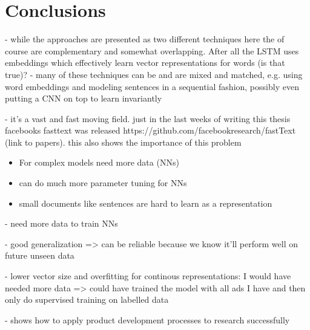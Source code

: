 
\clearpage

\section{Conclusions}
\label{sec:Conclusions}


- while the approaches are presented as two different techniques here the of course are complementary and somewhat overlapping. After all the LSTM uses embeddings which effectively learn vector representations for words (is that true)?
- many of these techniques can be and are mixed and matched, e.g. using word embeddings and modeling sentences in a sequential fashion, possibly even putting a CNN on top to learn invariantly

- it's a vast and fast moving field. just in the last weeks of writing this thesis facebooks fasttext was released https://github.com/facebookresearch/fastText (link to papers). this also shows the importance of this problem

\begin{itemize}
  \item For complex models need more data (NNs)
  \item can do much more parameter tuning for NNs
  \item small documents like sentences are hard to learn as a representation
\end{itemize}

- need more data to train NNs

- good generalization => can be reliable because we know it'll perform well on future unseen data


- lower vector size and overfitting for continous representations: I would have needed more data => could have trained the model with all ads I have and then only do supervised training on labelled data

- shows how to apply product development processes to research successfully

